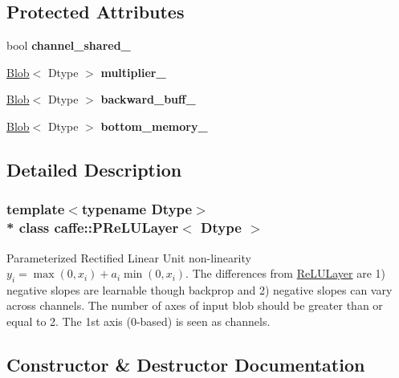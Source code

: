 \subsection*{Protected Attributes}
\begin{DoxyCompactItemize}
\item 
bool {\bfseries channel\+\_\+shared\+\_\+}\hypertarget{classcaffe_1_1PReLULayer_a300a9efaa34b12279331619be8c3e290}{}\label{classcaffe_1_1PReLULayer_a300a9efaa34b12279331619be8c3e290}

\item 
\hyperlink{classcaffe_1_1Blob}{Blob}$<$ Dtype $>$ {\bfseries multiplier\+\_\+}\hypertarget{classcaffe_1_1PReLULayer_a0d31c4cb909defbf0d4a26f8b5803c0b}{}\label{classcaffe_1_1PReLULayer_a0d31c4cb909defbf0d4a26f8b5803c0b}

\item 
\hyperlink{classcaffe_1_1Blob}{Blob}$<$ Dtype $>$ {\bfseries backward\+\_\+buff\+\_\+}\hypertarget{classcaffe_1_1PReLULayer_ab8e65fc14aca8e30bf19d65ef1c8eae0}{}\label{classcaffe_1_1PReLULayer_ab8e65fc14aca8e30bf19d65ef1c8eae0}

\item 
\hyperlink{classcaffe_1_1Blob}{Blob}$<$ Dtype $>$ {\bfseries bottom\+\_\+memory\+\_\+}\hypertarget{classcaffe_1_1PReLULayer_a8190f8d49d5078680ae11e4478a6981d}{}\label{classcaffe_1_1PReLULayer_a8190f8d49d5078680ae11e4478a6981d}

\end{DoxyCompactItemize}


\subsection{Detailed Description}
\subsubsection*{template$<$typename Dtype$>$\\*
class caffe\+::\+P\+Re\+L\+U\+Layer$<$ Dtype $>$}

Parameterized Rectified Linear Unit non-\/linearity $ y_i = \max(0, x_i) + a_i \min(0, x_i) $. The differences from \hyperlink{classcaffe_1_1ReLULayer}{Re\+L\+U\+Layer} are 1) negative slopes are learnable though backprop and 2) negative slopes can vary across channels. The number of axes of input blob should be greater than or equal to 2. The 1st axis (0-\/based) is seen as channels. 

\subsection{Constructor \& Destructor Documentation}
